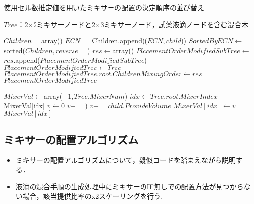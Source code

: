 \begin{algorithm}[tbp]
 \caption{使用セル数推定値を用いたミキサーの配置の決定順序の並び替え}\label{alg:ECN}
 \begin{algorithmic}[1]
     \Require $\mathit{Tree}$：2$\times$2ミキサーノードと2$\times$3ミキサーノード，試薬液滴ノードを含む混合木 

        \State $\mathit{Children}$ = array()
            \State $\mathit{ECN}=$ 
            \State Children.append(($\mathit{ECN},child$))
        \EndFor 
        \State $\mathit{SortedByECN} \gets $sorted($Children,reverse=$\True)
        \State $\mathit{res}\gets$array()
            \State $\mathit{PlacementOrderModifiedSubTree}\gets $
            \State $\mathit{res}$.append($\mathit{PlacementOrderModifiedSubTree}$) \EndFor 
        \State $\mathit{PlacementOrderModifiedTree}\gets \mathit{Tree}$ 
        \State $\mathit{PlacementOrderModifiedTree.root.ChildrenMixingOrder}\gets \mathit{res}
        $\Return $\mathit{PlacementOrderModifiedTree}$ 
    \EndFunction 
    
     \State $\mathit{MixerVal}\gets$array($-1,\mathit{Tree.MixerNum}$)
        \Else 
            \State $\mathit{idx}\gets \mathit{Tree.root.MixerIndex}$
            \Return MixerVal[idx]
            \Else 
                \State  $\mathit{v}\gets 0$
                        \State $v+= $)
                    \Else 
                        \State $v+=\mathit{child.ProvideVolume}$
                    \EndIf
                \EndFor 
                \State $\mathit{MixerVal[idx]}\gets v$
                \Return $\mathit{MixerVal[idx]}$
            \EndIf
        \EndIf
    \EndFunction 
 \end{algorithmic}
\end{algorithm}


\subsection{ミキサーの配置アルゴリズム}
\begin{itemize}
\item ミキサーの配置アルゴリズムについて，疑似コードを踏まえながら説明する．
\item 液滴の混合手順の生成処理中にミキサーのIF無しでの配置方法が見つからない場合，該当提供比率のx2スケーリングを行う.
\end{itemize}
